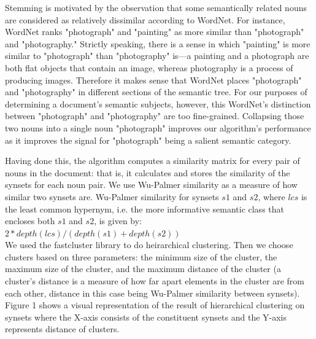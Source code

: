 \documentclass[11pt]{article}
\begin{document}
Stemming is motivated by the observation that some semantically related nouns are considered as relatively dissimilar according to WordNet. For instance, WordNet ranks "photograph" and "painting" as more similar than "photograph" and "photography." Strictly speaking, there is a sense in which "painting" is more similar to "photograph" than "photography" is—a painting and a photograph are both flat objects that contain an image, whereas photography is a process of producing images. Therefore it makes sense that WordNet places "photograph" and "photography" in different sections of the semantic tree. For our purposes of determining a document's semantic subjects, however, this WordNet's distinction between "photograph" and "photography" are too fine-grained. Collapsing those two nouns into a single noun "photograph" improves our algorithm's performance as it improves the signal for "photograph" being a salient semantic category.

Having done this, the algorithm computes a similarity matrix for every pair of nouns in the document: that is, it calculates and stores the similarity of the synsets for each noun pair. We use Wu-Palmer similarity as a measure of how similar two synsets are. Wu-Palmer similarity for synsets $s1$ and $s2$, where $lcs$ is the least common hypernym, i.e. the more informative semantic class that encloses both $s1$ and $s2$, is given by:\\

$2*depth(lcs) / (depth(s1) + depth(s2))$\\

We used the fastcluster library to do heirarchical clustering. Then we choose clusters based on three parameters: the minimum size of the cluster, the maximum size of the cluster, and the maximum distance of the cluster (a cluster's distance is a measure of how far apart elements in the cluster are from each other, distance in this case being Wu-Palmer similarity between synsets). Figure 1 shows a visual representation of the result of hierarchical clustering on synsets where the X-axis consists of the constituent synsets and the Y-axis represents distance of clusters.
\end{document}

